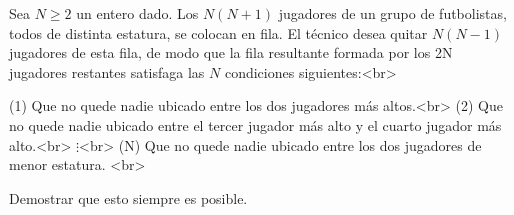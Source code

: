 Sea $N \ge 2$ un entero dado. Los $N(N + 1)$ jugadores de un grupo de futbolistas, todos de distinta estatura, se colocan en fila. El técnico desea quitar $N(N − 1)$ jugadores de esta fila, de modo que la fila resultante formada por los 2N jugadores restantes satisfaga las $N$ condiciones siguientes:<br>

(1) Que no quede nadie ubicado entre los dos jugadores más altos.<br>
(2) Que no quede nadie ubicado entre el tercer jugador más alto y el cuarto jugador más alto.<br>
$\vdots$<br>
(N) Que no quede nadie ubicado entre los dos jugadores de menor estatura. <br>

Demostrar que esto siempre es posible.